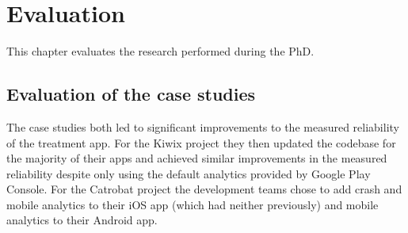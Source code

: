 \chapter{Evaluation}
This chapter evaluates the research performed during the PhD.

\section{Evaluation of the case studies}
The case studies both led to significant improvements to the measured reliability of the treatment app. For the Kiwix project they then updated the codebase for the majority of their apps and achieved similar improvements in the measured reliability despite only using the default analytics provided by Google Play Console. For the Catrobat project the development teams chose to add crash and mobile analytics to their iOS app (which had neither previously) and mobile analytics to their Android app.

